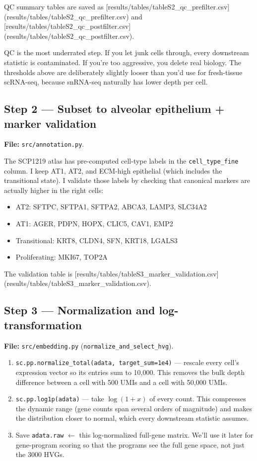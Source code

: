 \documentclass[11pt]{article}
\begin{document}
QC summary tables are saved as
[results/tables/tableS2\_qc\_prefilter.csv](results/tables/tableS2_qc_prefilter.csv)
and
[results/tables/tableS2\_qc\_postfilter.csv](results/tables/tableS2_qc_postfilter.csv).

\begin{whyblock}
QC is the most underrated step. If you let junk cells through, every
downstream statistic is contaminated. If you're too aggressive, you
delete real biology. The thresholds above are deliberately slightly
looser than you'd use for fresh-tissue scRNA-seq, because snRNA-seq
naturally has lower depth per cell.
\end{whyblock}

\subsection{Step 2 --- Subset to alveolar epithelium + marker validation}

\textbf{File:} \texttt{src/annotation.py}.

The SCP1219 atlas has pre-computed cell-type labels in the \texttt{cell\_type\_fine}
column. I keep AT1, AT2, and ECM-high epithelial (which includes the transitional
state). I validate those labels by checking that canonical markers are actually
higher in the right cells:
\begin{itemize}
\item AT2: SFTPC, SFTPA1, SFTPA2, ABCA3, LAMP3, SLC34A2
\item AT1: AGER, PDPN, HOPX, CLIC5, CAV1, EMP2
\item Transitional: KRT8, CLDN4, SFN, KRT18, LGALS3
\item Proliferating: MKI67, TOP2A
\end{itemize}

The validation table is [results/tables/tableS3\_marker\_validation.csv](results/tables/tableS3_marker_validation.csv).

\subsection{Step 3 --- Normalization and log-transformation}

\textbf{File:} \texttt{src/embedding.py} (\texttt{normalize\_and\_select\_hvg}).

\begin{enumerate}
\item \texttt{sc.pp.normalize\_total(adata, target\_sum=1e4)} --- rescale
every cell's expression vector so its entries sum to 10{,}000. This removes
the bulk depth difference between a cell with 500 UMIs and a cell with
50{,}000 UMIs.
\item \texttt{sc.pp.log1p(adata)} --- take $\log(1+x)$ of every count.
This compresses the dynamic range (gene counts span several orders of magnitude)
and makes the distribution closer to normal, which every downstream statistic
assumes.
\item Save \texttt{adata.raw} $\leftarrow$ this log-normalized full-gene matrix.
We'll use it later for gene-program scoring so that the programs see the full
gene space, not just the 3000 HVGs.
\end{enumerate}
\end{document}
